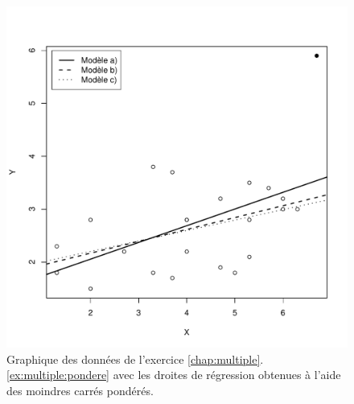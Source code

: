 \begin{solution}{3.17}
\begin{enumerate}
\begin{figure}[t]
\begin{knitrout}
\includegraphics[width=\maxwidth]{figure/unnamed-chunk-60-1}

\end{knitrout}
        \caption{Graphique des données de l'exercice
          \ref{chap:multiple}.\ref{ex:multiple:pondere} avec les
          droites de régression obtenues à l'aide des moindres carrés
          pondérés.}
        \label{fig:multiple:pondere2}
      \end{figure}
    \end{enumerate}
  
\end{solution}

